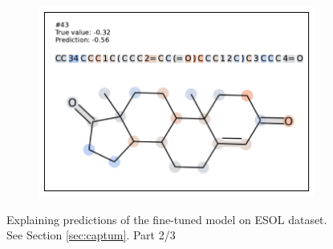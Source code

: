 \begin{figure}
\begin{subfigure}[b]{0.33\textwidth}
\end{subfigure}\begin{subfigure}[b]{0.33\textwidth} 
  \centering 
  \includegraphics[width=\textwidth]{figures/esol/esol43.pdf} 
\end{subfigure}


\caption{Explaining predictions of the fine-tuned model on ESOL dataset. See Section \ref{sec:captum}. Part 2/3}
\label{fig:captum-esol-2}
\end{figure}




